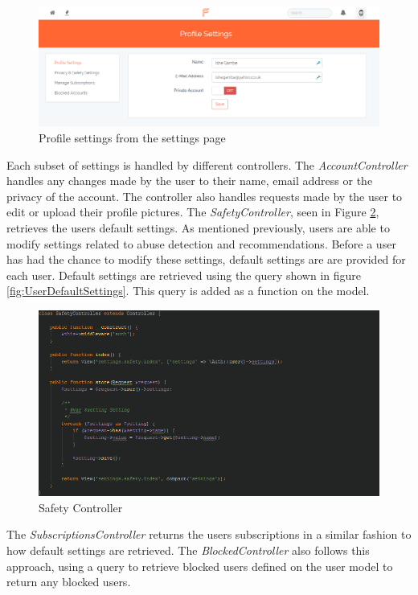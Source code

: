 \begin{figure}[H]
\centering
\includegraphics[width=\textwidth]{Images/Implementation/SettingsPage}
\caption{Profile settings from the settings page}
\label{fig:SettingsImplementation}
\end{figure}

Each subset of settings is handled by different controllers. The \textit{AccountController} handles any changes made by the user to their name, email address or the privacy of the account. The controller also handles requests made by the user to edit or upload their profile pictures. The \textit{SafetyController}, seen in Figure \ref{fig:SafetyController}, retrieves the users default settings. As mentioned previously, users are able to modify settings related to abuse detection and recommendations. Before a user has had the chance to modify these settings, default settings are are provided for each user. Default settings are retrieved using the query shown in figure \ref{fig:UserDefaultSettings}. This query is added as a function on the model.

\begin{figure}[H]
\centering
\includegraphics[width=\textwidth]{Images/Implementation/SafetyController}
\caption{Safety Controller}
\label{fig:SafetyController}
\end{figure}

The \textit{SubscriptionsController} returns the users subscriptions in a similar fashion to how default settings are retrieved. The \textit{BlockedController} also follows this approach, using a query to retrieve blocked users defined on the user model to return any blocked users.

